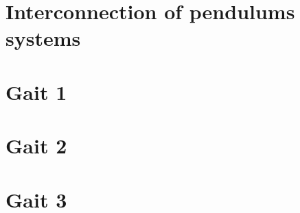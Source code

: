 \section{Interconnection of pendulums systems}

\FloatBarrier
\section{Gait 1}

\FloatBarrier
\section{Gait 2}

\FloatBarrier
\section{Gait 3}
